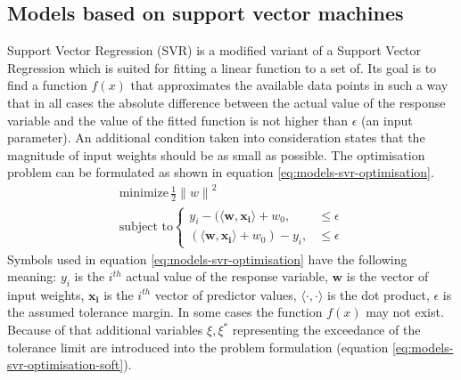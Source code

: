 \subsection{Models based on support vector machines}
Support Vector Regression (SVR) is a modified variant of a Support Vector Regression which is suited for fitting a linear function to a set of. Its goal is to find a function $f(x)$ that approximates the available data points in such a way that in all cases the absolute difference between the actual value of the response variable and the value of the fitted function is not higher than $\epsilon$ (an input parameter). An additional condition taken into consideration states that the magnitude of input weights should be as small as possible. The optimisation problem can be formulated as shown in equation \ref{eq:models-svr-optimisation}.
\begin{equation}\label{eq:models-svr-optimisation}
\begin{gathered}
    \text{minimize}\, \frac{1}{2} {\lVert {w} \rVert}^2 \\
    \text{subject to}
    \begin{cases}
        y_i - (\langle \bm{w}, \bm{x_i} \rangle + w_0, & \leq \epsilon \\
        (\langle \bm{w}, \bm{x_i} \rangle + w_0) - y_i, & \leq \epsilon
    \end{cases}
\end{gathered}
\end{equation}
Symbols used in equation \ref{eq:models-svr-optimisation} have the following meaning: $y_i$ is the $i^{th}$ actual value of the response variable, $\bm{w}$ is the vector of input weights, $\bm{x_i}$ is the $i^{th}$ vector of predictor values, $\langle \cdot, \cdot \rangle$ is the dot product, $\epsilon$ is the assumed tolerance margin. 
In some cases the function $f(x)$ may not exist. Because of that additional variables $\xi, {\xi}^*$ representing the exceedance of the tolerance limit are introduced into the problem formulation (equation \ref{eq:models-svr-optimisation-soft}).

